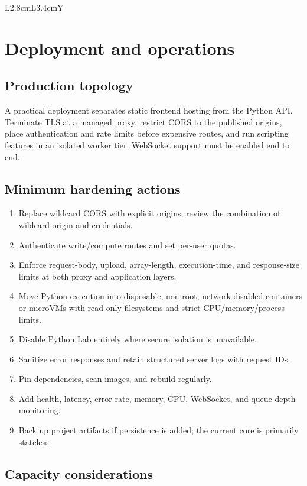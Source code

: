 \documentclass[10pt,a4paper]{article}
\begin{document}
\begin{tabularx}{\textwidth}{L{2.8cm}L{3.4cm}Y}
\section{Deployment and operations}

\subsection{Production topology}

A practical deployment separates static frontend hosting from the Python API. Terminate TLS at a managed proxy, restrict CORS to the published origins, place authentication and rate limits before expensive routes, and run scripting features in an isolated worker tier. WebSocket support must be enabled end to end.

\subsection{Minimum hardening actions}

\begin{enumerate}
  \item Replace wildcard CORS with explicit origins; review the combination of wildcard origin and credentials.
  \item Authenticate write/compute routes and set per-user quotas.
  \item Enforce request-body, upload, array-length, execution-time, and response-size limits at both proxy and application layers.
  \item Move Python execution into disposable, non-root, network-disabled containers or microVMs with read-only filesystems and strict CPU/memory/process limits.
  \item Disable Python Lab entirely where secure isolation is unavailable.
  \item Sanitize error responses and retain structured server logs with request IDs.
  \item Pin dependencies, scan images, and rebuild regularly.
  \item Add health, latency, error-rate, memory, CPU, WebSocket, and queue-depth monitoring.
  \item Back up project artifacts if persistence is added; the current core is primarily stateless.
\end{enumerate}

\subsection{Capacity considerations}


\end{tabularx}
\end{document}
